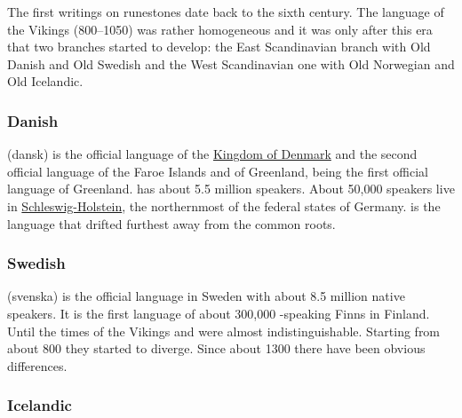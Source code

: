 The first writings on runestones date back to the sixth century. The language of the Vikings
(800--1050) was rather homogeneous and it was only after this era that two branches started to
develop: the East Scandinavian branch with Old Danish and Old Swedish and the West Scandinavian one
with Old Norwegian and Old Icelandic.


\subsubsection{Danish}

 (dansk) is the official language of the
\href{https://en.wikipedia.org/wiki/Denmark}{Kingdom of Denmark} and the second official language of the
Faroe Islands and of Greenland,  being the first official language of
Greenland.  has about 5.5 million speakers. About 50,000 speakers live in \href{https://en.wikipedia.org/wiki/Schleswig-Holstein}{Schleswig-Holstein}, the northernmost of the federal states of Germany.
 is the  language that drifted furthest away from the common  roots.


\subsubsection{Swedish}

 (svenska) is the official language in Sweden with about 8.5 million native speakers. It is
the first language of about 300,000 -speaking Finns in Finland. Until the times of the
Vikings  and  were almost indistinguishable. Starting from about 800 they started to
diverge. Since about 1300 there have been obvious differences.



\subsubsection{Icelandic}


